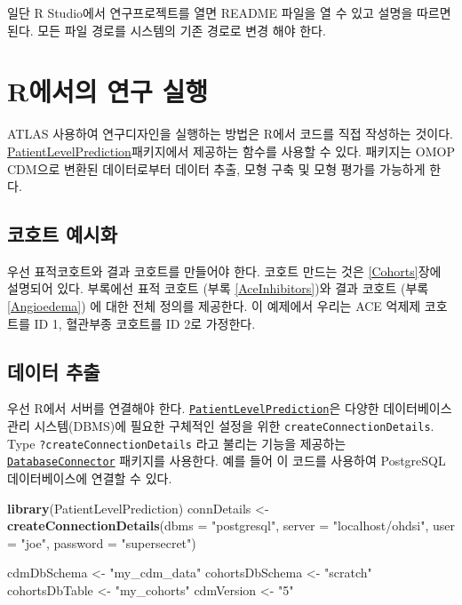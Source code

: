 \documentclass[11pt]{book}
\newenvironment{Shaded}{\begin{snugshade}}{\end{snugshade}}
\newcommand{\KeywordTok}[1]{\textcolor[rgb]{0.13,0.29,0.53}{\textbf{#1}}}
\newcommand{\DataTypeTok}[1]{\textcolor[rgb]{0.13,0.29,0.53}{#1}}
\newcommand{\StringTok}[1]{\textcolor[rgb]{0.31,0.60,0.02}{#1}}
\newcommand{\NormalTok}[1]{#1}
\theoremstyle{definition}
\theoremstyle{definition}
\theoremstyle{definition}
\theoremstyle{remark}
\begin{document}
일단 R Studio에서 연구프로젝트를 열면 README 파일을 열 수 있고 설명을
따르면 된다. 모든 파일 경로를 시스템의 기존 경로로 변경 해야 한다.

\section{R에서의 연구 실행}\label{r--}

ATLAS 사용하여 연구디자인을 실행하는 방법은 R에서 코드를 직접 작성하는
것이다.
\href{https://ohdsi.github.io/PatientLevelPrediction/}{PatientLevelPrediction}패키지에서
제공하는 함수를 사용할 수 있다. 패키지는 OMOP CDM으로 변환된
데이터로부터 데이터 추출, 모형 구축 및 모형 평가를 가능하게 한다.

\subsection{코호트 예시화}\label{-}

우선 표적코호트와 결과 코호트를 만들어야 한다. 코호트 만드는 것은
\ref{Cohorts}장에 설명되어 있다. 부록에선 표적 코호트 (부록
\ref{AceInhibitors})와 결과 코호트 (부록 \ref{Angioedema}) 에 대한 전체
정의를 제공한다. 이 예제에서 우리는 ACE 억제제 코호트를 ID 1, 혈관부종
코호트를 ID 2로 가정한다.

\subsection{데이터 추출}\label{--1}

우선 R에서 서버를 연결해야 한다.
\href{https://ohdsi.github.io/PatientLevelPrediction/}{\texttt{PatientLevelPrediction}}은
다양한 데이터베이스 관리 시스템(DBMS)에 필요한 구체적인 설정을 위한
\texttt{createConnectionDetails}. Type \texttt{?createConnectionDetails}
라고 불리는 기능을 제공하는
\href{https://ohdsi.github.io/DatabaseConnector/}{\texttt{DatabaseConnector}}
패키지를 사용한다. 예를 들어 이 코드를 사용하여 PostgreSQL
데이터베이스에 연결할 수 있다.

\begin{Shaded}
\begin{Highlighting}[]
\KeywordTok{library}\NormalTok{(PatientLevelPrediction)}
\NormalTok{connDetails <-}\StringTok{ }\KeywordTok{createConnectionDetails}\NormalTok{(}\DataTypeTok{dbms =} \StringTok{"postgresql"}\NormalTok{,}
                                       \DataTypeTok{server =} \StringTok{"localhost/ohdsi"}\NormalTok{,}
                                       \DataTypeTok{user =} \StringTok{"joe"}\NormalTok{,}
                                       \DataTypeTok{password =} \StringTok{"supersecret"}\NormalTok{)}

\NormalTok{cdmDbSchema <-}\StringTok{ "my_cdm_data"}
\NormalTok{cohortsDbSchema <-}\StringTok{ "scratch"}
\NormalTok{cohortsDbTable <-}\StringTok{ "my_cohorts"}
\NormalTok{cdmVersion <-}\StringTok{ "5"}
\end{Highlighting}
\end{Shaded}
\end{document}
